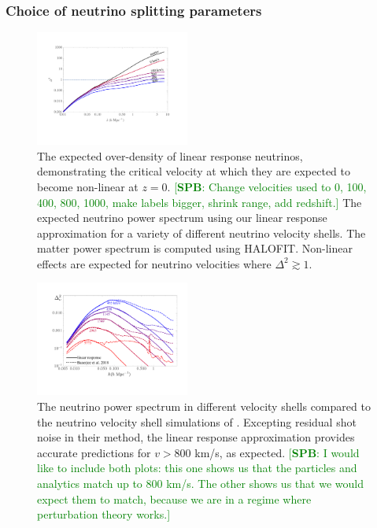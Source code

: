 \documentclass[useAMS, usenatbib]{mnras}
\newcommand{\spb}[1]{{\textcolor{green}{[{\bf SPB}: #1]}}}
\begin{document}
\subsubsection{Choice of neutrino splitting parameters}
\label{sec:parameters}

\begin{figure}
\includegraphics[width=0.45\textwidth]{nuplots/lin_resp_halofit.pdf}
\caption{The expected over-density of linear response neutrinos, demonstrating the critical velocity at which they are expected to become non-linear at $z=0$. \spb{Change velocities used to 0, 100, 400, 800, 1000, make labels bigger, shrink range, add redshift.} The expected neutrino power spectrum using our linear response approximation for a variety of different neutrino velocity shells. The matter power spectrum is computed using {\small HALOFIT}. Non-linear effects are expected for neutrino velocities where $\Delta^2 \gtrsim 1$.
  }
\label{fig:halofitvshell}
\end{figure}

\begin{figure}
  \includegraphics[width=0.45\textwidth]{nuplots/banerjee_lin_resp.pdf}
  \caption{
  The neutrino power spectrum in different velocity shells compared to the neutrino velocity shell simulations of \protect\cite{Banerjee_2018}. Excepting residual shot noise in their method, the linear response approximation provides accurate predictions for $v > 800$ km/s, as expected. \spb{I would like to include both plots: this one shows us that the particles and analytics match up to 800 km/s. The other shows us that we would expect them to match, because we are in a regime where perturbation theory works.}
  }
  \label{fig:simvshell}
\end{figure}
\end{document}
